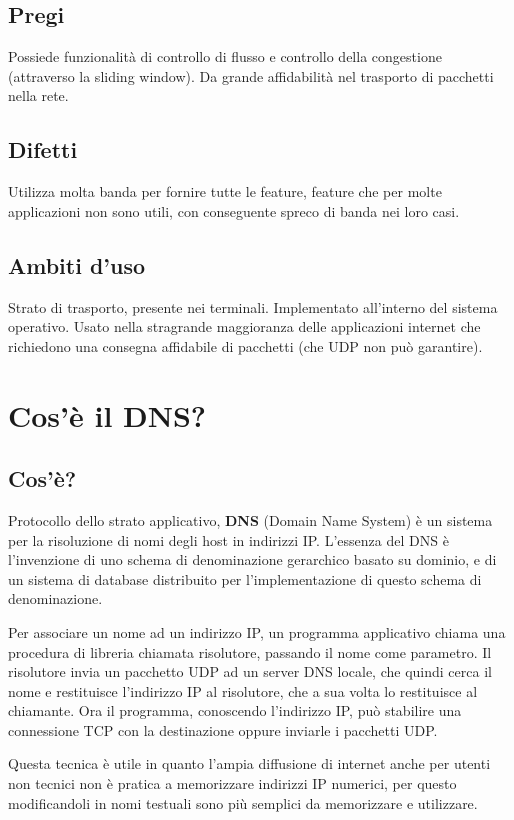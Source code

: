 \subsection{Pregi}
Possiede funzionalità di controllo di flusso e controllo della congestione (attraverso la sliding window).
Da grande affidabilità nel trasporto di pacchetti nella rete.

\subsection{Difetti}
Utilizza molta banda per fornire tutte le feature, feature che per molte applicazioni non sono utili, con conseguente spreco di banda nei loro casi.

\subsection{Ambiti d'uso}
Strato di trasporto, presente nei terminali. Implementato all'interno del sistema operativo. Usato nella stragrande maggioranza delle applicazioni internet che richiedono una consegna affidabile di pacchetti (che UDP non può garantire).

\section{Cos'è il DNS?}
\subsection{Cos'è?}
Protocollo dello strato applicativo, \textbf{DNS} (Domain Name System) è un sistema per la risoluzione di nomi degli host in indirizzi IP. 
L'essenza del DNS è l'invenzione di uno schema di denominazione gerarchico basato su dominio, e di un sistema di database distribuito per l'implementazione di questo schema di denominazione.

Per associare un nome ad un indirizzo IP, un programma applicativo chiama una procedura di libreria chiamata risolutore, passando il nome come parametro. Il risolutore invia un pacchetto UDP ad un server DNS locale, che quindi cerca il nome e restituisce l'indirizzo IP al risolutore, che a sua volta lo restituisce al chiamante. Ora il programma, conoscendo l'indirizzo IP, può stabilire una connessione TCP con la destinazione oppure inviarle i pacchetti UDP.

Questa tecnica è utile in quanto l'ampia diffusione di internet anche per utenti non tecnici non è pratica a memorizzare indirizzi IP numerici, per questo modificandoli in nomi testuali sono più semplici da memorizzare e utilizzare.

